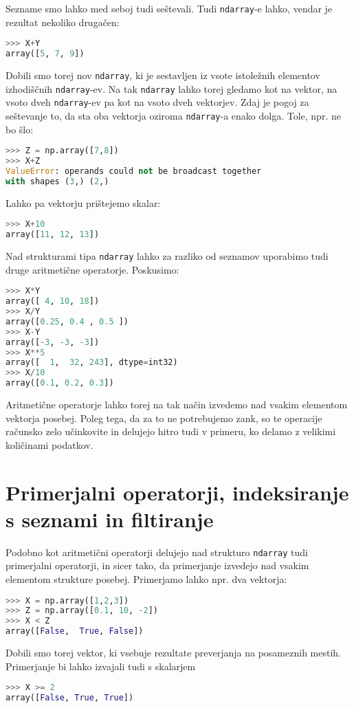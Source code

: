 Sezname smo lahko med seboj tudi seštevali. Tudi \texttt{ndarray}-e lahko, vendar je rezultat nekoliko drugačen:
\begin{lstlisting}[language=Python]
>>> X+Y
array([5, 7, 9])
\end{lstlisting}
Dobili smo torej nov \texttt{ndarray}, ki je sestavljen iz vsote istoležnih elementov izhodiščnih \texttt{ndarray}-ev. Na tak \texttt{ndarray} lahko torej gledamo kot na vektor, na vsoto dveh \texttt{ndarray}-ev pa kot na vsoto dveh vektorjev. Zdaj je pogoj za seštevanje to, da sta oba vektorja oziroma \texttt{ndarray}-a enako dolga. Tole, npr. ne bo šlo:
\begin{lstlisting}[language=Python]
>>> Z = np.array([7,8])
>>> X+Z
ValueError: operands could not be broadcast together
with shapes (3,) (2,) 
\end{lstlisting}
Lahko pa vektorju prištejemo skalar:
\begin{lstlisting}[language=Python]
>>> X+10
array([11, 12, 13]) 
\end{lstlisting}
Nad strukturami tipa \texttt{ndarray} lahko za razliko od seznamov uporabimo tudi druge aritmetične operatorje. Poskusimo:
\begin{lstlisting}[language=Python]
>>> X*Y
array([ 4, 10, 18])
>>> X/Y
array([0.25, 0.4 , 0.5 ])
>>> X-Y
array([-3, -3, -3])
>>> X**5
array([  1,  32, 243], dtype=int32)
>>> X/10
array([0.1, 0.2, 0.3])
\end{lstlisting}
Aritmetične operatorje lahko torej na tak način izvedemo nad vsakim elementom vektorja posebej. Poleg tega, da za to ne potrebujemo zank, so te operacije računsko zelo učinkovite in delujejo hitro tudi v primeru, ko delamo z velikimi količinami podatkov. 

\section{Primerjalni operatorji, indeksiranje s seznami in filtiranje}

Podobno kot aritmetični operatorji delujejo nad strukturo  \texttt{ndarray} tudi primerjalni operatorji, in sicer tako, da primerjanje izvedejo nad vsakim elementom strukture posebej. Primerjamo lahko npr. dva vektorja:
\begin{lstlisting}[language=Python]
>>> X = np.array([1,2,3])
>>> Z = np.array([0.1, 10, -2])
>>> X < Z
array([False,  True, False])
\end{lstlisting}
Dobili smo torej vektor, ki vsebuje rezultate preverjanja na posameznih mestih. Primerjanje bi lahko izvajali tudi s skalarjem
\begin{lstlisting}[language=Python]
>>> X >= 2
array([False, True, True])
\end{lstlisting}

